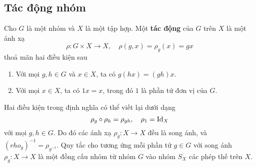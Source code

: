 

\subsection{Tác động nhóm}
\begin{defn}\label{defn 1.1.1}
    Cho $G$ là một nhóm và $X$ là một tập hợp. Một \textbf{tác động} của $G$ trên $X$ là một ánh xạ
    \[\rho: G \times X \to X,\quad \rho(g,x) = \rho_g(x) = gx \]
    thoả mãn hai điều kiện sau
    \begin{enumerate}
        \item Với mọi $g,h \in G$ và $x\in X$, ta có $g(hx) = (gh)x$.
        \item Với mọi $x\in X$, ta có $1x=x$, trong đó $1$ là phần tử đơn vị của $G$.
    \end{enumerate}
\end{defn}

Hai điều kiện trong định nghĩa có thể viết lại dưới dạng 
\[\rho_g \circ \rho_h = \rho_{gh},\quad \rho_1 = \operatorname{Id}_X\]
với mọi $g,h \in G$. Do đó các ánh xạ $\rho_g: X \to X$ đều là song ánh, và $(rho_g)^{-1} = \rho_{g^{-1}}$. Quy tắc cho tương ứng mỗi phần tử $g \in G$ với song ánh $\rho_g: X\to X$ là một đồng cấu nhóm từ nhóm $G$ vào nhóm $S_X$ các phép thế trên $X$.

